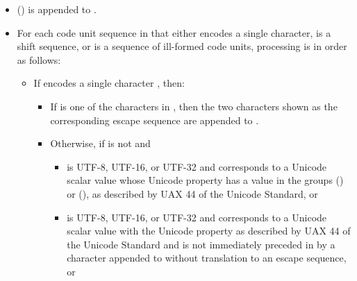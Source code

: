 \documentclass{wg21}
\begin{document}


\begin{itemize}
\item
{} () is appended to .

\item
For each code unit sequence  in  that either
encodes a single character,
is a shift sequence, or
is a sequence of ill-formed code units,
processing is in order as follows:

\begin{itemize}
\item
If  encodes a single character , then:

\begin{itemize}
    \item
    If  is one of the characters in ,
    then the two characters shown as the corresponding escape sequence
    are appended to .

    \item
    Otherwise, if  is not  and

    \begin{itemize}
        \item
         is UTF-8, UTF-16, or UTF-32 and
         corresponds to a Unicode scalar value
        whose Unicode property  has a value in the groups
         () or  (),
        as described by UAX 44 of the Unicode Standard, or

        \item
         is UTF-8, UTF-16, or UTF-32 and
         corresponds to a Unicode scalar value
        with the Unicode property 
        as described by UAX 44 of the Unicode Standard and
         is not immediately preceded in  by
        a character  appended to 
        without translation to an escape sequence, or


\end{itemize}
\end{itemize}
\end{itemize}
\end{itemize}
\end{document}

